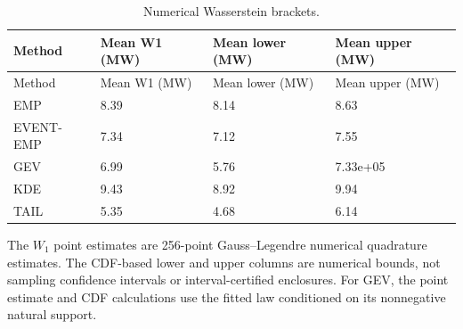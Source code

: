 \begingroup
\fontsize{8.5}{10.5}\selectfont\setlength{\tabcolsep}{3pt}
\begin{longtable}{@{}llll@{}}
\caption{Numerical Wasserstein brackets.}\label{tab:final-si-6}\\
\toprule
Method & Mean W1 (MW) & Mean lower (MW) & Mean upper (MW)\\\midrule\endfirsthead
Method & Mean W1 (MW) & Mean lower (MW) & Mean upper (MW)\\\midrule\endhead
EMP & 8.39 & 8.14 & 8.63\\
EVENT-EMP & 7.34 & 7.12 & 7.55\\
GEV & 6.99 & 5.76 & 7.33e+05\\
KDE & 9.43 & 8.92 & 9.94\\
TAIL & 5.35 & 4.68 & 6.14\\
\bottomrule
\end{longtable}
\noindent\footnotesize The $W_1$ point estimates are 256-point Gauss--Legendre numerical quadrature estimates. The CDF-based lower and upper columns are numerical bounds, not sampling confidence intervals or interval-certified enclosures. For GEV, the point estimate and CDF calculations use the fitted law conditioned on its nonnegative natural support.
\endgroup
